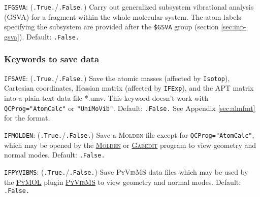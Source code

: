 \documentclass[12pt,english]{extarticle}
\begin{document}
\bigskip{}\bigskip{}
\verb|IFGSVA|: (\verb|.True.|/\verb|.False.|)   Carry out generalized subsystem vibrational analysis (GSVA) for a fragment within the whole molecular system. The atom labels specifying the subsystem are provided after the  \verb|$GSVA| group (section \ref{sec:inp-gsva}).
Default: \verb|.False.|


\subsubsection{Keywords to save data} \label{subsec:inp-qcdata-save}

\bigskip{}\bigskip{}
\verb|IFSAVE|: (\verb|.True.|/\verb|.False.|) Save the atomic masses (affected by
\verb|Isotop|), Cartesian coordinates, Hessian matrix (affected by
\verb|IFExp|), and the APT matrix into a plain text data file *.umv. This keyword
doesn't work with \verb|QCProg="AtomCalc"| or \verb|"UniMoVib"|. Default: \verb|.False.| See Appendix \ref{sec:almfmt} for the format.

\bigskip{}\bigskip{}
\verb|IFMOLDEN|: (\verb|.True.|/\verb|.False.|) Save a \textsc{Molden} file except for \verb|QCProg="AtomCalc"|, which may be opened by the \href{https://www.theochem.ru.nl/molden/}{\textsc{Molden}} or \href{http://gabedit.sourceforge.net/}{\textsc{Gabedit}} program to view geometry and normal modes. Default: \verb|.False.|

\bigskip{}\bigskip{}
\verb|IFPYVIBMS|: (\verb|.True.|/\verb|.False.|) Save \textsc{PyVibMS} data files which may be used by the \href{https://pymol.org/}{\textsc{PyMOL}} plugin \href{https://github.com/smutao/PyVibMS}{\textsc{PyVibMS}} to view geometry and normal modes. Default: \verb|.False.|
\end{document}
